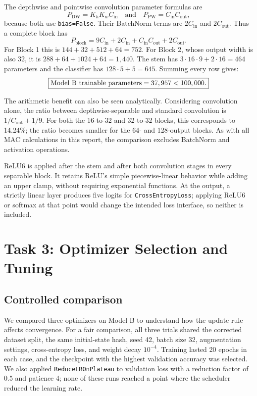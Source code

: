 \documentclass[11pt,a4paper]{article}
\begin{document}
The depthwise and pointwise convolution parameter formulas are
\[
P_{\mathrm{DW}}=K_hK_wC_{\mathrm{in}} \quad\text{and}\quad
P_{\mathrm{PW}}=C_{\mathrm{in}}C_{\mathrm{out}},
\]
because both use \texttt{bias=False}. Their BatchNorm terms are $2C_{\mathrm{in}}$ and $2C_{\mathrm{out}}$. Thus a complete block has
\[
P_{\mathrm{block}}=9C_{\mathrm{in}}+2C_{\mathrm{in}}+C_{\mathrm{in}}C_{\mathrm{out}}+2C_{\mathrm{out}}.
\]
For Block 1 this is $144+32+512+64=752$. For Block 2, whose output width is also 32, it is $288+64+1024+64=1,440$. The stem has $3\cdot16\cdot9+2\cdot16=464$ parameters and the classifier has $128\cdot5+5=645$. Summing every row gives:
\[
\boxed{\text{Model B trainable parameters}=37,957<100,000.}
\]

The arithmetic benefit can also be seen analytically. Considering convolution alone, the ratio between depthwise-separable and standard convolution is $1/C_{\mathrm{out}}+1/9$. For both the 16-to-32 and 32-to-32 blocks, this corresponds to 14.24\%; the ratio becomes smaller for the 64- and 128-output blocks. As with all MAC calculations in this report, the comparison excludes BatchNorm and activation operations.

ReLU6 is applied after the stem and after both convolution stages in every separable block. It retains ReLU's simple piecewise-linear behavior while adding an upper clamp, without requiring exponential functions. At the output, a strictly linear layer produces five logits for \texttt{CrossEntropyLoss}; applying ReLU6 or softmax at that point would change the intended loss interface, so neither is included.

\clearpage
\section{Task 3: Optimizer Selection and Tuning}
\subsection{Controlled comparison}
We compared three optimizers on Model B to understand how the update rule affects convergence. For a fair comparison, all three trials shared the corrected dataset split, the same initial-state hash, seed 42, batch size 32, augmentation settings, cross-entropy loss, and weight decay $10^{-4}$. Training lasted 20 epochs in each case, and the checkpoint with the highest validation accuracy was selected. We also applied \texttt{ReduceLROnPlateau} to validation loss with a reduction factor of 0.5 and patience 4; none of these runs reached a point where the scheduler reduced the learning rate.
\end{document}
